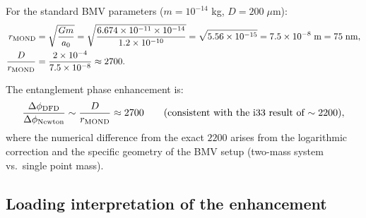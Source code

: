 \documentclass[11pt,a4paper]{article}
\begin{document}
For the standard BMV parameters ($m = 10^{-14}$ kg, $D = 200\;\mu$m):
\begin{align}
r_{\rm MOND} &= \sqrt{\frac{Gm}{a_0}}
= \sqrt{\frac{6.674\times 10^{-11}\times 10^{-14}}{1.2\times 10^{-10}}}
= \sqrt{5.56\times 10^{-15}}
= 7.5\times 10^{-8}\;\text{m} = 75\;\text{nm}, \\
\frac{D}{r_{\rm MOND}} &= \frac{2\times 10^{-4}}{7.5\times 10^{-8}}
\approx 2700.
\end{align}

The entanglement phase enhancement is:
\begin{equation}
\frac{\Delta\phi_{\rm DFD}}{\Delta\phi_{\rm Newton}}
\sim \frac{D}{r_{\rm MOND}} \approx 2700
\qquad\text{(consistent with the i33 result of $\sim 2200$)},
\end{equation}
where the numerical difference from the exact $2200$ arises from the
logarithmic correction and the specific geometry of the BMV setup
(two-mass system vs.\ single point mass).

\subsection{Loading interpretation of the enhancement}
\end{document}
